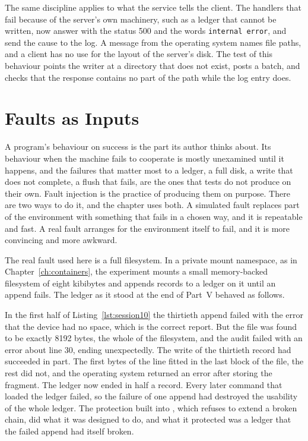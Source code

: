 The same discipline applies to what the service tells the client. The handlers that fail because of the server's own machinery, such as a ledger that cannot be written, now answer with the status 500 and the words \texttt{internal error}, and send the cause to the log. A message from the operating system names file paths, and a client has no use for the layout of the server's disk. The test of this behaviour points the writer at a directory that does not exist, posts a batch, and checks that the response contains no part of the path while the log entry does.

\section{Faults as Inputs}

A program's behaviour on success is the part its author thinks about. Its behaviour when the machine fails to cooperate is mostly unexamined until it happens, and the failures that matter most to a ledger, a full disk, a write that does not complete, a flush that fails, are the ones that tests do not produce on their own. Fault injection is the practice of producing them on purpose. There are two ways to do it, and the chapter uses both. A simulated fault replaces part of the environment with something that fails in a chosen way, and it is repeatable and fast. A real fault arranges for the environment itself to fail, and it is more convincing and more awkward.

The real fault used here is a full filesystem. In a private mount namespace, as in Chapter~\ref{ch:containers}, the experiment mounts a small memory-backed filesystem of eight kibibytes and appends records to a ledger on it until an append fails. The ledger as it stood at the end of Part~V behaved as follows.



In the first half of Listing~\ref{lst:session10} the thirtieth append failed with the error that the device had no space, which is the correct report. But the file was found to be exactly 8192 bytes, the whole of the filesystem, and the audit failed with an error about line 30, ending unexpectedly. The write of the thirtieth record had succeeded in part. The first bytes of the line fitted in the last block of the file, the rest did not, and the operating system returned an error after storing the fragment. The ledger now ended in half a record. Every later command that loaded the ledger failed, so the failure of one append had destroyed the usability of the whole ledger. The protection built into , which refuses to extend a broken chain, did what it was designed to do, and what it protected was a ledger that the failed append had itself broken.

